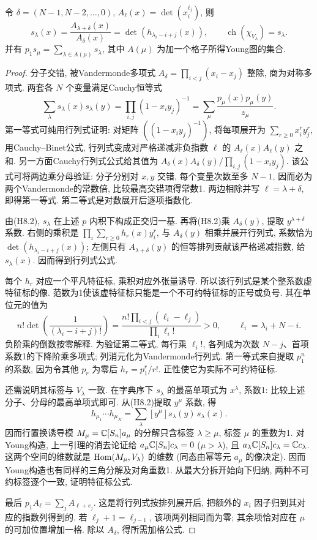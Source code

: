 \begin{lemma}\label{hw:schur-tools}
令 $\delta=(N-1,N-2,\ldots,0)$, $A_\ell(x)=\det(x_i^{\ell_j})$, 则
\[
 s_\lambda(x)=\frac{A_{\lambda+\delta}(x)}{A_\delta(x)}
 =\det(h_{\lambda_i-i+j}(x)),\qquad
 \operatorname{ch}(\chi_{V_\lambda})=s_\lambda.
\]
并有 $p_1s_\mu=\sum_{\lambda\in A(\mu)}s_\lambda$, 其中 $A(\mu)$ 为加一个格子所得Young图的集合.
\end{lemma}
\begin{proof}
分子交错, 被Vandermonde多项式 $A_\delta=\prod_{i<j}(x_i-x_j)$ 整除, 商为对称多项式. 两套各 $N$ 个变量满足Cauchy恒等式
\[
 \sum_\lambda s_\lambda(x)s_\lambda(y)
 =\prod_{i,j}(1-x_iy_j)^{-1}
 =\sum_\mu\frac{p_\mu(x)p_\mu(y)}{z_\mu}.       \tag{H8.2}
\]
第一等式可纯用行列式证明: 对矩阵 $((1-x_iy_j)^{-1})$, 将每项展开为 $\sum_{r\ge0}x_i^ry_j^r$, 用Cauchy--Binet公式, 行列式变成对严格递减非负指数 $\ell$ 的 $A_\ell(x)A_\ell(y)$ 之和. 另一方面Cauchy行列式公式给其值为 $A_\delta(x)A_\delta(y)/\prod_{i,j}(1-x_iy_j)$. 该公式可将两边乘分母验证: 分子分别对 $x,y$ 交错, 每个变量次数至多 $N-1$, 因而必为两个Vandermonde的常数倍, 比较最高交错项得常数1. 两边相除并写 $\ell=\lambda+\delta$, 即得第一等式. 第二等式是对数展开后逐项指数化.

由(H8.2), $s_\lambda$ 在上述 $p$ 内积下构成正交归一基. 再将(H8.2)乘 $A_\delta(y)$, 提取 $y^{\lambda+\delta}$ 系数. 右侧的乘积是 $\prod_i\sum_{r\ge0}h_r(x)y_i^r$, 与 $A_\delta(y)$ 相乘并展开行列式, 系数恰为 $\det(h_{\lambda_i-i+j}(x))$; 左侧只有 $A_{\lambda+\delta}(y)$ 的恒等排列贡献该严格递减指数, 给 $s_\lambda(x)$. 因而得到行列式公式.

每个 $h_r$ 对应一个平凡特征标, 乘积对应外张量诱导. 所以该行列式是某个整系数虚特征标的像. 范数为1使该虚特征标只能是一个不可约特征标的正号或负号. 其在单位元的值为
\[
 n!\det\left(\frac1{(\lambda_i-i+j)!}\right)
 =\frac{n!\prod_{i<j}(\ell_i-\ell_j)}{\prod_i\ell_i!}>0,
 \qquad \ell_i=\lambda_i+N-i.                   \tag{H8.3}
\]
负阶乘的倒数按零解释. 为验证第二等式, 每行乘 $\ell_i!$, 各列成为次数 $N-j$、首项系数1的下降阶乘多项式; 列消元化为Vandermonde行列式. 第一等式来自提取 $p_1^n$ 的系数, 因为令其他 $p_r$ 为零后 $h_r=p_1^r/r!$. 正性使它为实际不可约特征标.

还需说明其标签与 $V_\lambda$ 一致. 在字典序下 $s_\lambda$ 的最高单项式为 $x^\lambda$, 系数1: 比较上述分子、分母的最高单项式即可. 从(H8.2)提取 $y^\mu$ 系数, 得
\[
 h_{\mu_1}\cdots h_{\mu_N}
 =\sum_\lambda [y^\mu]s_\lambda(y)\,s_\lambda(x).
\]
因而行置换诱导模 $M_\mu=\mathbb C[S_n]a_\mu$ 的分解只含标签 $\lambda\ge\mu$, 标签 $\mu$ 的重数为1. 对Young构造, 上一引理的消去论证给 $a_\mu\mathbb C[S_n]c_\lambda=0$ ($\mu>\lambda$), 且 $a_\lambda\mathbb C[S_n]c_\lambda=\mathbb C c_\lambda$. 这两个空间的维数就是 $\operatorname{Hom}(M_\mu,V_\lambda)$ 的维数 (同态由幂等元 $a_\mu$ 的像决定). 因而Young构造也有同样的三角分解及对角重数1. 从最大分拆开始向下归纳, 两种不可约标签逐个一致, 证明特征标公式.

最后 $p_1A_\ell=\sum_j A_{\ell+e_j}$. 这是将行列式按排列展开后, 把额外的 $x_i$ 因子归到其对应的指数列得到的. 若 $\ell_j+1=\ell_{j-1}$, 该项两列相同而为零; 其余项恰对应在 $\mu$ 的可加位置增加一格. 除以 $A_\delta$, 得所需加格公式.
\end{proof}

